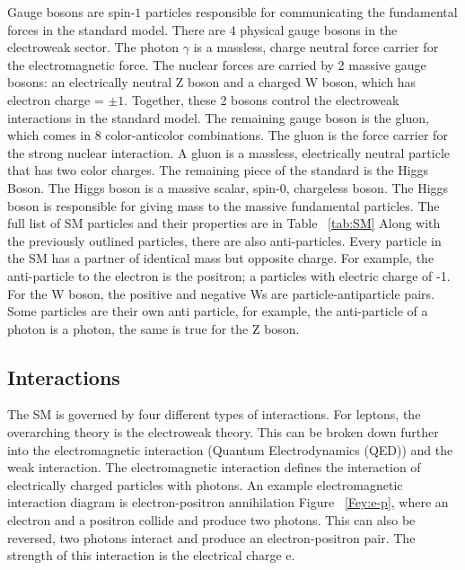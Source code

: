 \indent Gauge bosons are spin-${1}$ particles responsible for communicating the fundamental forces in the standard model. There are 4 physical gauge bosons in the electroweak sector. The photon ${\gamma}$ is a massless, charge neutral force carrier for the electromagnetic force. The nuclear forces are carried by 2 massive gauge bosons:  an electrically neutral Z boson and a charged W boson, which has electron charge = ${\pm 1}$. Together, these 2 bosons control the electroweak interactions in the standard model. The remaining gauge boson is the gluon, which comes in 8 color-anticolor combinations. The gluon is the force carrier for the strong nuclear interaction. A gluon is a massless, electrically neutral particle that has two color charges. \newline%
\indent The remaining piece of the standard is the Higgs Boson. The Higgs boson is a massive scalar, spin-${0}$, chargeless boson. The Higgs boson is responsible for giving mass to the massive fundamental particles. The full list of SM particles and their properties are in Table ~\ref{tab:SM}\newline
\indent Along with the previously outlined particles, there are also anti-particles. Every particle in the SM has a partner of identical mass but opposite charge. For example, the anti-particle to the electron is the positron; a particles with electric charge of -1. For the W boson, the positive and negative Ws are particle-antiparticle pairs. Some particles are their own anti particle, for example, the anti-particle of a photon is a photon, the same is true for the Z boson.\newline
\subsection{Interactions}
The SM is governed by four different types of interactions. For leptons, the overarching theory is the electroweak theory. This can be broken down further into the electromagnetic interaction (Quantum Electrodynamics (QED)) and the weak interaction. The electromagnetic interaction defines the interaction of electrically charged particles with photons. An example electromagnetic interaction diagram is electron-positron annihilation Figure ~\ref{Fey:e-p}, where an electron and a positron collide and produce two photons. This can also be reversed, two photons interact and produce an electron-positron pair. The strength of this interaction is the electrical charge e. \newline

